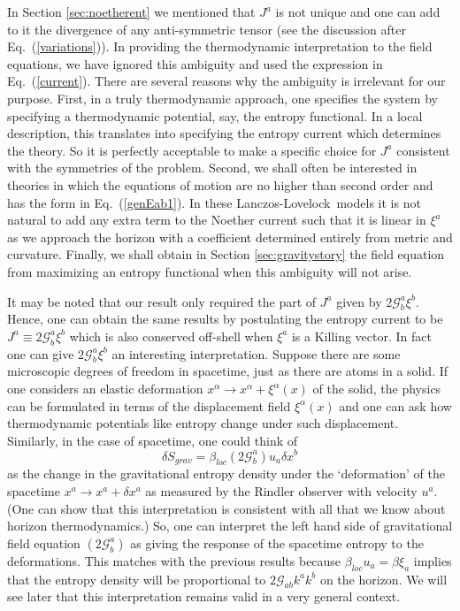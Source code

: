 \documentclass[12pt]{iopart}
\def\eq#1{{Eq.~(\ref{#1})}}
\newcommand{\LL}{Lanczos-Lovelock}
\begin{document}
 
 In Section \ref{sec:noetherent} we mentioned that $J^a$ is not unique and one can
 add to it the divergence of any anti-symmetric tensor (see the discussion after
 \eq{variations}). In providing the thermodynamic interpretation to the field equations,
 we have ignored this ambiguity and used the expression in \eq{current}. 
 There are several reasons why the ambiguity is irrelevant for our purpose. First,
 in a truly thermodynamic approach, one specifies the system by specifying a thermodynamic potential, say, the entropy functional. In a local description, this translates into 
 specifying the entropy current which determines the theory. So it is perfectly acceptable to make a specific choice for $J^a$ consistent with the symmetries of the problem. Second, we shall often be interested in theories in which the equations of motion are no higher
 than second order and has the form in \eq{genEab1}. In these 
 \LL\ models it is not natural to add any extra term to the Noether current such that
 it is linear in $\xi^a$ as we approach the horizon with a coefficient determined entirely from metric and curvature. Finally, we shall obtain  in Section \ref{sec:gravitystory}
 the field equation from maximizing an entropy functional when this ambiguity will not 
 arise. 
 
 It may be noted that our result only required the part of $J^a$ given by $2\mathcal{G}^a_b\xi^b$.
 Hence, one can obtain the same results by postulating the entropy current to be $J^a \equiv 2\mathcal{G}^a_b\xi^b$ which is also conserved off-shell when $\xi^a$ is a Killing vector.
  In fact one can give $2\mathcal{G}^a_b\xi^b$ an interesting interpretation. Suppose there are some microscopic degrees of freedom in spacetime, just as there are atoms in a solid. If one considers   an elastic deformation $x^\alpha\to x^\alpha+\xi^\alpha(x)$ of the solid, the physics can be formulated in terms of the displacement field $ \xi^\alpha(x)$ and one can ask how thermodynamic potentials like entropy change under such displacement. Similarly, in the case of spacetime, one could think of
\begin{equation}
\delta S_{grav}=\beta_{loc}(2\mathcal{G}^a_b)u_a\delta x^b
\label{gradentropy}
\end{equation} 
 as the change in the gravitational entropy density under the `deformation' of the spacetime $x^a\to x^a+\delta x^a$ as measured by the Rindler observer with velocity $u^a$. (One can show that this interpretation is consistent with all that we know about horizon thermodynamics.) So, one can interpret the left hand side of gravitational field equation $(2\mathcal{G}^a_b)$ as giving the response of the spacetime entropy to the deformations. This
 matches with the previous results  because $ \beta_{loc} u_a=\beta\xi_a$ implies that  the entropy density will be proportional to $2\mathcal{G}_{ab}k^ak^b$ on the horizon. We will see later that this interpretation remains valid in a very general context.
 
\end{document}
